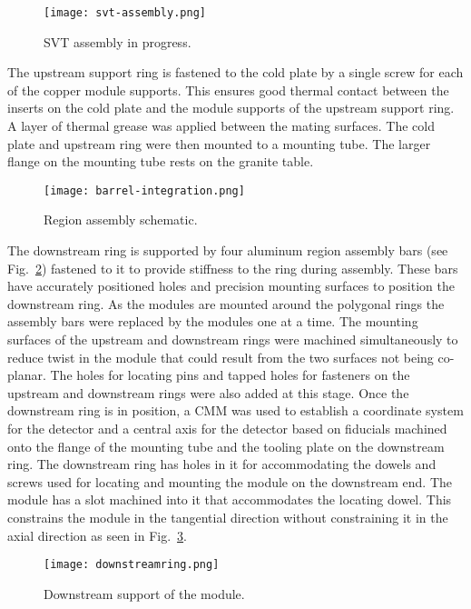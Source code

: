 \begin{figure}[hbt] 
\centering 
\texttt{[image: svt-assembly.png]}
\caption{SVT assembly in progress.}
\label{fig:svt-assembly}
\end{figure}

The upstream support ring is fastened to the cold plate by a single screw for each of the copper module supports. This ensures good thermal contact between the inserts on the cold plate and the module supports of the upstream support ring. A layer of thermal grease was applied between the mating surfaces. The cold plate and upstream ring were then mounted to a mounting tube. The larger flange on the mounting tube rests on the granite table. 

\begin{figure}[hbt] 
\centering 
\texttt{[image: barrel-integration.png]}
\caption{Region assembly schematic.}
\label{fig:barrel-integration}
\end{figure}

The downstream ring is supported by four aluminum region assembly bars (see Fig.~\ref{fig:barrel-integration}) fastened to it to provide stiffness to the ring during assembly. These bars have accurately positioned holes and precision mounting surfaces to position the downstream ring. As the modules are mounted around the polygonal rings the assembly bars were replaced by the modules one at a time. The mounting surfaces of the upstream and downstream rings were machined simultaneously to reduce twist in the module that could result from the two surfaces not being co-planar. The holes for locating pins and tapped holes for fasteners on the upstream and downstream rings were also added at this stage. Once the downstream ring is in position, a CMM was used to establish a coordinate system for the detector and a central axis for the detector based on fiducials machined onto the flange of the mounting tube and the tooling plate on the downstream ring. The downstream ring has holes in it for accommodating the dowels and screws used for locating and mounting the module on the downstream end. The module has a slot machined into it that accommodates the locating dowel. This constrains the module in the tangential direction without constraining it in the axial direction as seen in Fig.~\ref{fig:downstreamring}. 

\begin{figure}[hbt] 
\centering 
\texttt{[image: downstreamring.png]}
\caption{Downstream support of the module.}
\label{fig:downstreamring}
\end{figure}


